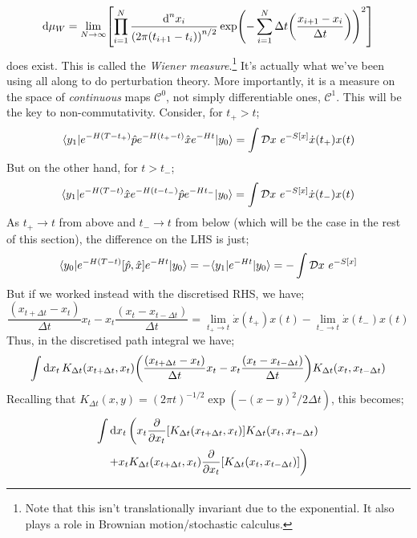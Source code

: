 \begin{equation}
\ud \mu_W = \lim_{N \rightarrow \infty}\left[\prod_{i = 1}^{N}\frac{\ud^n x_i}{\left(2\pi(t_{i + 1} - t_{i})\right)^{n/2}}\exp\left(-\sum_{i = 1}^{N}{\Delta t\left(\frac{x_{i + 1} - x_{i}}{\Delta t}\right)}\right)^2\right]
\end{equation}
does exist. This is called the \emph{Wiener measure}.\footnote{Note that this isn't translationally invariant due to the exponential. It also plays a role in Brownian motion/stochastic calculus.} It's actually what we've been using all along to do perturbation theory. More importantly, it is a measure on the space of \emph{continuous} maps $\mathcal{C}^{0}$, not simply differentiable ones, $\mathcal{C}^{1}$. This will be the key to non-commutativity. Consider, for $t_+ > t$;
\begin{dmath*}
\bra{y_1}e^{-H(T - t_+)}\hat{p}e^{-H(t_+ - t)}\hat{x}e^{-Ht}\ket{y_0} = \int{\mD x\,\,e^{-S[x]}\dot{x}(t_+)x(t)}
\end{dmath*}
But on the other hand, for $t > t_-$;
\begin{dmath*}
\bra{y_1}e^{-H(T - t)}\hat{x}e^{-H(t - t_-)}\hat{p}e^{-Ht_-}\ket{y_0} = \int{\mD x\,\,e^{-S[x]}\dot{x}(t_-)x(t)}
\end{dmath*}
As $t_+ \rightarrow t$ from above and $t_-\rightarrow t$ from below (which will be the case in the rest of this section), the difference on the LHS is just;
\begin{equation}
\bra{y_0}e^{-H(T - t)}[\hat{p}, \hat{x}]e^{-Ht}\ket{y_0} = -\bra{y_1}e^{-Ht}\ket{y_0} = -\int{\mD x\,\,e^{-S[x]}}
\end{equation}
But if we worked instead with the discretised RHS, we have;
\begin{equation*}
\frac{(x_{t + \Delta t} - x_t)}{\Delta t}x_t - x_t\frac{(x_t - x_{t - \Delta t})}{\Delta t} = \lim_{t_+ \rightarrow t}\dot{x}(t_+)x(t) - \lim_{t_-\rightarrow t}\dot{x}(t_-)x(t)
\end{equation*}
Thus, in the discretised path integral we have;
\begin{dmath*}
\int{\upd{x_t}K_{\Delta t}\left(x_{t + \Delta t}, x_t\right)\left(\frac{(x_{t + \Delta t} - x_t)}{\Delta t}x_t - x_t\frac{(x_t - x_{t - \Delta t})}{\Delta t}\right)K_{\Delta t}\left(x_t, x_{t - \Delta t}\right)}
\end{dmath*}
Recalling that $K_{\Delta t}(x, y) = (2 \pi t)^{-1/2}\exp\left(-(x - y)^2/2\Delta t\right)$, this becomes;
\begin{multline*}
\int{\upd{x_t}\left(x_t\frac{\del}{\del x_t}\left[K_{\Delta t}\left(x_{t + \Delta t}, x_t\right)\right]K_{\Delta t}\left(x_t, x_{t - \Delta t}\right)\right.} \\ \left.+ x_t K_{\Delta t}\left(x_{t + \Delta t}, x_t\right)\frac{\del}{\del x_t}\left[K_{\Delta t}\left(x_t, x_{t - \Delta t}\right)\right]\right)
\end{multline*}
